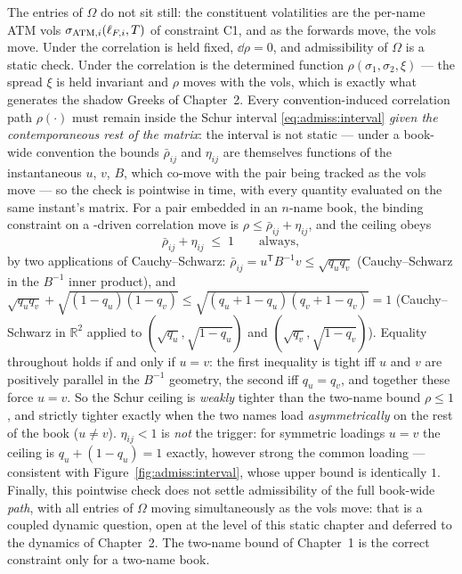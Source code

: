 \begin{remark}
\label{rem:admiss:sticky}
The entries of $\Omega$ do not sit still: the constituent volatilities are
the per-name ATM vols $\sigma_{\mathrm{ATM},i}(\ell_{F,i}, T)$ of constraint C1, and as
the forwards move, the vols move. Under \stickyrho{} the correlation is
held fixed, $\dd\rho = 0$, and admissibility of $\Omega$ is a static check.
Under \stickycvc{} the correlation is the determined function
$\rho(\sigma_1, \sigma_2, \xi)$ --- the spread $\xi$ is held invariant and
$\rho$ moves with the vols, which is exactly what generates the shadow
Greeks of Chapter~2. Every convention-induced correlation path
$\rho(\cdot)$ must remain inside the Schur interval
\eqref{eq:admiss:interval} \emph{given the contemporaneous rest of the
matrix}: the interval is not static --- under a book-wide convention the
bounds $\bar\rho_{ij}$ and $\eta_{ij}$ are themselves functions of the
instantaneous $u$, $v$, $B$, which co-move with the pair being tracked as
the vols move --- so the check is pointwise in time, with every quantity
evaluated on the same instant's matrix. For a pair embedded in an
$n$-name book, the binding constraint on a \stickycvc{}-driven correlation
move is $\rho \le \bar\rho_{ij} + \eta_{ij}$, and the ceiling obeys
\[
  \bar\rho_{ij} + \eta_{ij} \;\le\; 1 \qquad\text{always},
\]
by two applications of Cauchy--Schwarz:
$\bar\rho_{ij} = u^{\mathsf T} B^{-1} v \le \sqrt{q_u q_v}$
(Cauchy--Schwarz in the $B^{-1}$ inner product), and
$\sqrt{q_u q_v} + \sqrt{(1 - q_u)(1 - q_v)} \le
\sqrt{(q_u + 1 - q_u)(q_v + 1 - q_v)} = 1$ (Cauchy--Schwarz in
$\mathbb{R}^2$ applied to $(\sqrt{q_u}, \sqrt{1 - q_u})$ and
$(\sqrt{q_v}, \sqrt{1 - q_v})$). Equality throughout holds if and only if
$u = v$: the first inequality is tight iff $u$ and $v$ are positively
parallel in the $B^{-1}$ geometry, the second iff $q_u = q_v$, and
together these force $u = v$. So the Schur ceiling is \emph{weakly}
tighter than the two-name bound $\rho \le 1$, and strictly tighter exactly
when the two names load \emph{asymmetrically} on the rest of the book
($u \ne v$). $\eta_{ij} < 1$ is \emph{not} the trigger: for
symmetric loadings $u = v$ the ceiling is
$q_u + (1 - q_u) = 1$ exactly, however strong the common loading ---
consistent with Figure~\ref{fig:admiss:interval}, whose upper bound is
identically $1$. Finally, this pointwise check does not settle
admissibility of the full book-wide \stickycvc{} \emph{path}, with all
entries of $\Omega$ moving simultaneously as the vols move: that is a
coupled dynamic question, open at the level of this static chapter and
deferred to the dynamics of Chapter~2. The two-name bound of Chapter~1 is
the correct constraint only for a two-name book.
\end{remark}

